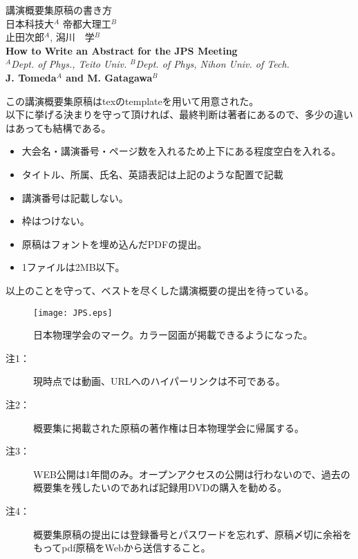 \documentclass[12pt,a4paper]{jsarticle}
\begin{document}
\vspace{-5pt}
\begin{center}
{\gt \Large 講演概要集原稿の書き方 }\\[14pt]

{\gt \large 日本科技大$^A$ 帝都大理工$^B$ \\ 止田次郎$^A$, 潟川　学$^B$}\\[5pt]

{\large \bf How to Write an Abstract for the JPS Meeting}\\[5pt]

{\large \it $^A$Dept. of Phys., Teito Univ. $^B$Dept. of Phys, Nihon Univ. of Tech.}\\

{\large \bf J. Tomeda$^A$ and M. Gatagawa$^B$}
\end{center}

\vspace{10pt}

この講演概要集原稿はtexのtemplateを用いて用意された。\\
以下に挙げる決まりを守って頂ければ、最終判断は著者にあるので、多少の違いはあっても結構である。

\begin{itemize}
\item 大会名・講演番号・ページ数を入れるため上下にある程度空白を入れる。
\item タイトル、所属、氏名、英語表記は上記のような配置で記載
\item 講演番号は記載しない。
\item 枠はつけない。
\item 原稿はフォントを埋め込んだPDFの提出。
\item 1ファイルは2MB以下。
\end{itemize}

以上のことを守って、ベストを尽くした講演概要の提出を待っている。


\begin{figure}[h]
\begin{center}
\texttt{[image: JPS.eps]}
\end{center}
\caption{日本物理学会のマーク。カラー図面が掲載できるようになった。 }
\end{figure}


\begin{description}
\item[注1：] 現時点では動画、URLへのハイパーリンクは不可である。
\item[注2：] 概要集に掲載された原稿の著作権は日本物理学会に帰属する。
\item[注3：] WEB公開は1年間のみ。オープンアクセスの公開は行わないので、過去の概要集を残したいのであれば記録用DVDの購入を勧める。
\item[注4：] 概要集原稿の提出には登録番号とパスワードを忘れず、原稿〆切に余裕をもってpdf原稿をWebから送信すること。
\end{description}
\end{document}
